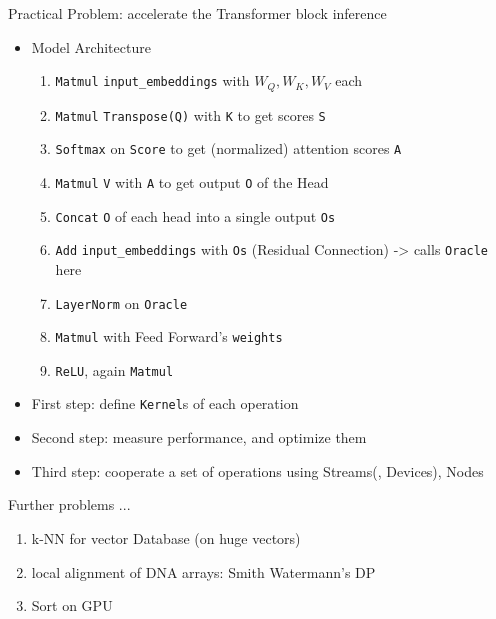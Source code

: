 \documentclass[dvipdfmx, 11pt, aspectratio=169]{beamer}   %
\begin{document}
\begin{frame}{Practical Problem: accelerate the Transformer block inference}
  \begin{itemize}
    \item Model Architecture
    \begin{enumerate}
      \item \lstinline|Matmul| \lstinline|input_embeddings| with $W_Q, W_K, W_V$ each
      \item \lstinline|Matmul| \lstinline|Transpose(Q)| with \lstinline|K| to get scores \lstinline|S|
      \item \lstinline|Softmax| on \lstinline|Score| to get (normalized) attention scores \lstinline|A|
      \item \lstinline|Matmul| \lstinline|V| with \lstinline|A| to get output \lstinline|O| of the Head
      \item \lstinline|Concat| \lstinline|O| of each head into a single output \lstinline|Os|
      \item \lstinline|Add| \lstinline|input_embeddings| with \lstinline|Os| (Residual Connection) -> calls \lstinline|Oracle| here
      \item \lstinline|LayerNorm| on \lstinline|Oracle| 
      \item \lstinline|Matmul| with Feed Forward's \lstinline|weights|
      \item \lstinline|ReLU|, again \lstinline|Matmul|
    \end{enumerate}
    \item First step: define \lstinline|Kernel|s of each operation
    \item Second step: measure performance, and optimize them
    \item Third step: cooperate a set of operations using Streams(, Devices), Nodes
  \end{itemize}
\end{frame}
\begin{frame}{Further problems ...}
  \begin{enumerate}
    \item k-NN for vector Database (on huge vectors)
    \item local alignment of DNA arrays: Smith Watermann's DP
    \item Sort on GPU
  \end{enumerate}
\end{frame}
\end{document}
